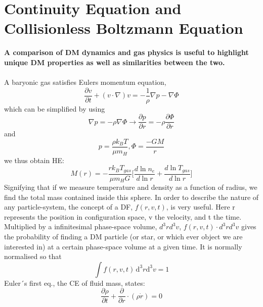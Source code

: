 \section{Continuity Equation and Collisionless Boltzmann Equation}
\textbf{A comparison of DM dynamics and gas physics is useful to highlight unique DM properties as well as similarities between the two.} \\ \\

A baryonic gas satisfies Eulers momentum equation,
\begin{equation}
\frac{\partial v}{\partial t} + (v\cdot \nabla)v = -\frac{1}{\rho}\nabla p - \nabla \Phi 
\end{equation}
which can be simplified by using
\begin{equation}
\nabla p = - \rho \nabla \Phi \rightarrow \frac{\partial p}{\partial r} = -\rho \frac{\partial \Phi}{\partial r}
\end{equation}
and
\begin{equation}
p = \frac{\rho k_B T}{\mu m_H} , \Phi = \frac{-GM}{r}
\end{equation}
we thus obtain HE:
\begin{equation}
M(r) = -\frac{rk_BT_{gas}}{\mu m_HG}\Bigg[\frac{d\ln n_e}{d\ln r} + \frac{d\ln T_{gas}}{d\ln r} \Bigg] 
\end{equation}
Signifying that if we measure temperature and density as a function of radius, we find the total mass contained inside this sphere. In order to describe the nature of any particle-system, the concept of a DF, $ f(r,v,t) $, is very useful. Here r represents the position in configuration space, v the velocity, and t the time. Multiplied by a infinitesimal phase-space volume, $ d^3rd^3v $, $ f(r,v,t)\cdot d^3rd^3v $ gives the probability of finding a DM particle (or star, or which ever object we are interested in) at a certain phase-space volume at a given time. It is normally normalised so that \\
\begin{equation}
\int \! f(r,v,t) \, \mathrm{d^3}r \mathrm{d^3}v
 = 1
\end{equation}
Euler´s first eq., the CE of fluid mass, states:
\begin{equation}
\frac{\partial \rho}{\partial t} + \frac{\partial}{\partial r}\cdot (\rho \dot{r}) = 0
\end{equation}

